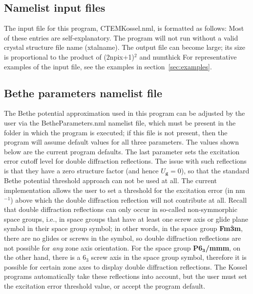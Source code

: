 \documentclass[DIV=calc, paper=letter, fontsize=11pt]{scrartcl}	 %
\begin{document}
\subsection{Namelist input files\label{sec:f90inputKossel}}
The input file for this program, \textsf{CTEMKossel.nml}, is formatted as follows:
Most of these entries are self-explanatory.  The program will not run
without a valid crystal structure file name (xtalname).  The output
file can become large; its size is proportional to the product 
of (2npix+1)$^2$ and numthick  For representative 
examples of the input file, see the examples in section~\ref{sec:examples}.

\subsection{Bethe parameters namelist file\label{sec:f90BetheParameters}}
The Bethe potential approximation used in this program can be adjusted by the
user via the \textsf{BetheParameters.nml} namelist file, which must be present 
in the folder in which the program is executed; if this file is not present, then the
program will assume default values for all three parameters.  The values shown below
are the current program defaults.
The last parameter sets the excitation error cutoff level for double diffraction reflections.  The issue with
such reflections is that they have a zero structure factor (and hence $U_{\mathbf{g}} = 0$), so that 
the standard Bethe potential threshold approach can not be used at all.  The current implementation
allows the user to set a threshold for the excitation error (in nm$^{-1}$) above which the double diffraction reflection
will not contribute at all.  Recall that double diffraction reflections can only occur in so-called non-symmorphic 
space groups, i.e., in space groups that have at least one screw axis or glide plane symbol in their space 
group symbol; in other words, in the space group \textbf{Fm$\bar{\mathbf{3}}$m}, there are no glides or screws in
the symbol, so double diffraction reflections are not possible for \textit{any} zone axis orientation.  For the space group \textbf{P6$_{\mathbf{3}}$/mmm},
on the other hand, there is a $6_3$ screw axis in the space group symbol, therefore it is possible for certain
zone axes to display double diffraction reflections.  The Kossel programs automatically take these reflections into account, but the user must
set the excitation error threshold value, or accept the program default.
\end{document}
